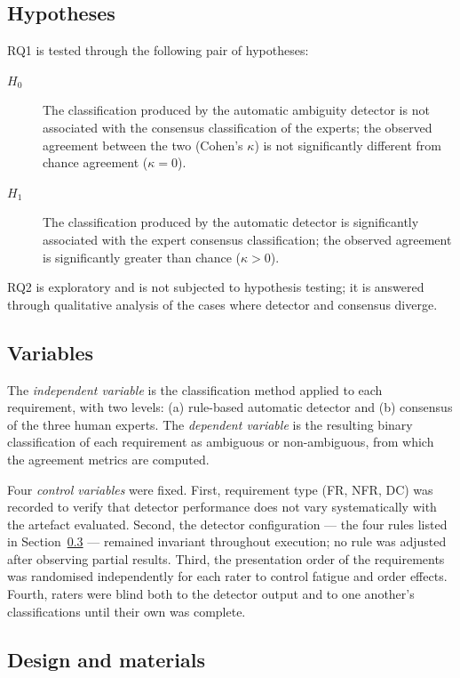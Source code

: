 \documentclass[pdflatex,sn-mathphys-num]{sn-jnl}
\theoremstyle{thmstyleone}%
\theoremstyle{thmstyletwo}%
\theoremstyle{thmstylethree}%
\begin{document}
\subsection{Hypotheses}\label{subsec:hypotheses}

RQ1 is tested through the following pair of hypotheses:

\begin{description}
  \item[$H_0$] The classification produced by the automatic ambiguity detector
  is not associated with the consensus classification of the experts; the
  observed agreement between the two (Cohen's $\kappa$) is not significantly
  different from chance agreement ($\kappa = 0$).
  \item[$H_1$] The classification produced by the automatic detector is
  significantly associated with the expert consensus classification; the
  observed agreement is significantly greater than chance ($\kappa > 0$).
\end{description}

RQ2 is exploratory and is not subjected to hypothesis testing; it is answered
through qualitative analysis of the cases where detector and consensus diverge.

\subsection{Variables}\label{subsec:variables}

The \emph{independent variable} is the classification method applied to each
requirement, with two levels: (a) rule-based automatic detector and (b) consensus
of the three human experts. The \emph{dependent variable} is the resulting
binary classification of each requirement as ambiguous or non-ambiguous, from
which the agreement metrics are computed.

Four \emph{control variables} were fixed. First, requirement type (FR, NFR, DC)
was recorded to verify that detector performance does not vary systematically
with the artefact evaluated. Second, the detector configuration --- the four
rules listed in Section~\ref{subsec:design} --- remained invariant throughout
execution; no rule was adjusted after observing partial results. Third, the
presentation order of the requirements was randomised independently for each
rater to control fatigue and order effects. Fourth, raters were blind both to
the detector output and to one another's classifications until their own was
complete.

\subsection{Design and materials}\label{subsec:design}
\end{document}
